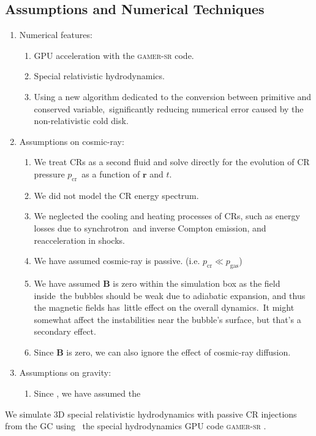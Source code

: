 \documentclass[twocolumn]{aastex631}
\begin{document}
\subsection{Assumptions and Numerical Techniques}
\begin{enumerate}
  \item Numerical features:
    \begin{enumerate}
      \item GPU acceleration with the \textsc{gamer-sr} code.
      \item Special relativistic hydrodynamics.
      \item Using a new algorithm dedicated to the conversion between primitive and conserved variable,\
            significantly reducing numerical error caused by the non-relativistic cold disk.
    \end{enumerate}
  \item Assumptions on cosmic-ray:
    \begin{enumerate}
      \item We treat CRs as a second fluid and solve directly for the evolution of CR pressure $p_{\text{cr}}$\
            as a function of $\mathbf{r}$ and $t$.
      \item We did not model the CR energy spectrum.
      \item We neglected the cooling and heating processes of CRs, such as energy losses due to synchrotron\
            and inverse Compton emission, and reacceleration in shocks.
      \item We have assumed cosmic-ray is passive. (i.e. $p_{\text{cr}}\ll p_{\text{gas}}$)
      \item We have assumed $\mathbf{B}$ is zero within the simulation box as the field inside\
            the bubbles should be weak due to adiabatic expansion, and thus the magnetic fields has\
            little effect on the overall dynamics.\
            It might somewhat affect the instabilities near the bubble's surface, but that's a secondary effect.
      \item Since $\mathbf{B}$ is zero, we can also ignore the effect of cosmic-ray diffusion.
    \end{enumerate}
  \item Assumptions on gravity:
    \begin{enumerate}
      \item Since , we have assumed the
    \end{enumerate}
\end{enumerate}
We simulate 3D special relativistic hydrodynamics with passive CR injections from the GC using \
the special hydrodynamics GPU code \textsc{gamer-sr} \citep{tseng2021}.
\end{document}
